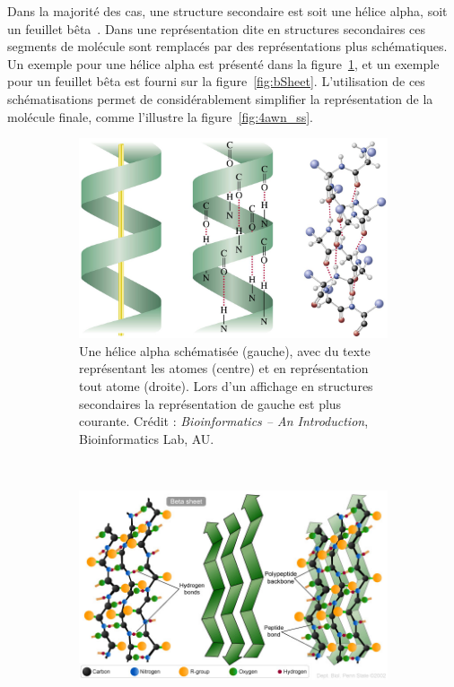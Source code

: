 	Dans la majorité des cas, une structure secondaire est soit une hélice alpha, soit un feuillet bêta~\cite{pauling1951structure}. Dans une représentation dite \og en structures secondaires \fg{} ces segments de molécule sont remplacés par des représentations plus schématiques. Un exemple pour une hélice alpha est présenté dans la figure~\ref{fig:aHelix}, et un exemple pour un feuillet bêta est fourni sur la figure~\ref{fig:bSheet}. L'utilisation de ces schématisations permet de considérablement simplifier la représentation de la molécule finale, comme l'illustre la figure~\ref{fig:4awn_ss}.
	
	\begin{figure}[htb]
		\begin{subfigure}[b]{.5\textwidth}
			\centering
			\includegraphics[width=\textwidth]{./figures/ch1/aHelix}
			\caption[Hélices alpha, trois représentations différentes.]{Une hélice alpha schématisée (gauche), avec du texte représentant les atomes (centre) et en représentation \og tout atome \fg{} (droite). Lors d'un affichage \og en structures secondaires \fg{} la représentation de gauche est plus courante. Crédit : \emph{Bioinformatics -- An Introduction}, Bioinformatics Lab, AU\footnotemark.}
			\label{fig:aHelix}
		\end{subfigure}
		~
		\begin{subfigure}[b]{.5\textwidth}
			\centering
			\includegraphics[width=\textwidth]{./figures/ch1/bSheet}

\end{subfigure}
\end{figure}
